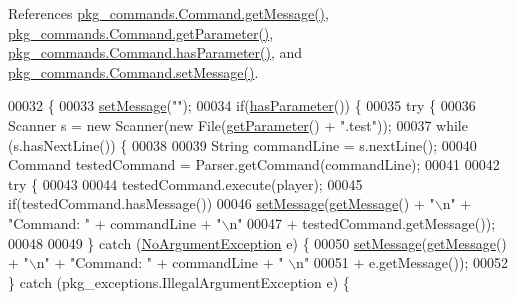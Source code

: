 References \hyperlink{Command_8java_source_l00066}{pkg\-\_\-commands.\-Command.\-get\-Message()}, \hyperlink{Command_8java_source_l00034}{pkg\-\_\-commands.\-Command.\-get\-Parameter()}, \hyperlink{Command_8java_source_l00050}{pkg\-\_\-commands.\-Command.\-has\-Parameter()}, and \hyperlink{Command_8java_source_l00058}{pkg\-\_\-commands.\-Command.\-set\-Message()}.


\begin{DoxyCode}
00032                                                                                                            
        \{
00033         \hyperlink{classpkg__commands_1_1Command_ae210ff216fe908b111ba1c988a963d13}{setMessage}(\textcolor{stringliteral}{""});
00034         \textcolor{keywordflow}{if}(\hyperlink{classpkg__commands_1_1Command_a02af95ab3f1898a66259ab7c177b6998}{hasParameter}()) \{
00035             \textcolor{keywordflow}{try} \{
00036                 Scanner s = \textcolor{keyword}{new} Scanner(\textcolor{keyword}{new} File(\hyperlink{classpkg__commands_1_1Command_a41c92d445be73ea9d62320c65efb8434}{getParameter}() + \textcolor{stringliteral}{".test"}));
00037                 \textcolor{keywordflow}{while} (s.hasNextLine()) \{
00038 
00039                     String commandLine = s.nextLine();
00040                     Command testedCommand = Parser.getCommand(commandLine);
00041 
00042                     \textcolor{keywordflow}{try} \{
00043 
00044                         testedCommand.execute(player);
00045                         \textcolor{keywordflow}{if}(testedCommand.hasMessage())
00046                             \hyperlink{classpkg__commands_1_1Command_ae210ff216fe908b111ba1c988a963d13}{setMessage}(\hyperlink{classpkg__commands_1_1Command_ac2a42e2bab264821892daefaf9a18b6c}{getMessage}() + \textcolor{stringliteral}{"\(\backslash\)n"} + \textcolor{stringliteral}{"Command: "} + commandLine 
      + \textcolor{stringliteral}{"\(\backslash\)n"}
00047                                     + testedCommand.getMessage());
00048 
00049                     \} \textcolor{keywordflow}{catch} (\hyperlink{classpkg__exceptions_1_1NoArgumentException}{NoArgumentException} e) \{
00050                         \hyperlink{classpkg__commands_1_1Command_ae210ff216fe908b111ba1c988a963d13}{setMessage}(\hyperlink{classpkg__commands_1_1Command_ac2a42e2bab264821892daefaf9a18b6c}{getMessage}() + \textcolor{stringliteral}{"\(\backslash\)n"} + \textcolor{stringliteral}{"Command: "} + commandLine + \textcolor{stringliteral}{"
      \(\backslash\)n"}
00051                                 + e.getMessage());
00052                     \} \textcolor{keywordflow}{catch} (pkg\_exceptions.IllegalArgumentException e) \{

\end{DoxyCode}

